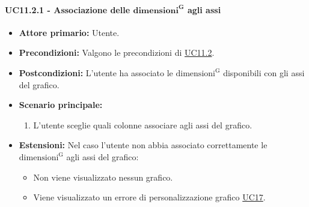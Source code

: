 \paragraph{UC11.2.1 - Associazione delle ${\mathbf{dimensioni^{G}}}$ agli assi}
\label{sec:UC11.2.1}
    \begin{itemize}
        \item \textbf{Attore primario:} Utente.
        \item \textbf{Precondizioni:} Valgono le precondizioni di \hyperref[sec:UC11.2]{UC11.2}.
	    \item \textbf{Postcondizioni:} L'utente ha associato le ${\mathrm{dimensioni^{G}}}$ disponibili con gli assi del grafico.
	    \item \textbf{Scenario principale:} 
	    \begin{enumerate}
	    		\item L'utente sceglie quali colonne associare agli assi del grafico.
		\end{enumerate}
	    \item \textbf{Estensioni:} Nel caso l'utente non abbia associato correttamente le ${\mathrm{dimensioni^{G}}}$ agli assi del grafico:
              \begin{itemize}
                  \item Non viene visualizzato nessun grafico.
                  \item Viene visualizzato un errore di personalizzazione grafico \hyperref[sec:UC17 - Errore di personalizzazione]{UC17}.
              \end{itemize}
    \end{itemize}

\newpage

